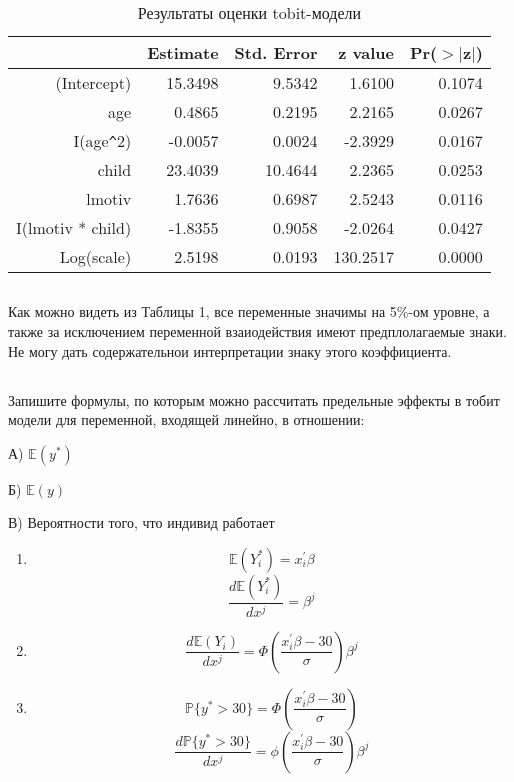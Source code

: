 \documentclass[a4paper,12pt]{article}
\def \mbb{\mathbb}
\def \P{\mbb{P}}
\def \E{\mbb{E}}
\def \b{\beta}
\begin{document}
\begin{table}[ht]
	\centering
	\begin{tabular}{|rrrrr|}
		\hline
		& Estimate & Std. Error & z value & Pr($>$$|$z$|$) \\ 
		\hline
		(Intercept) & 15.3498 & 9.5342 & 1.6100 & 0.1074 \\ 
		age & 0.4865 & 0.2195 & 2.2165 & 0.0267 \\ 
		I(age\verb|^|2) & -0.0057 & 0.0024 & -2.3929 & 0.0167 \\ 
		child & 23.4039 & 10.4644 & 2.2365 & 0.0253 \\ 
		lmotiv & 1.7636 & 0.6987 & 2.5243 & 0.0116 \\ 
		I(lmotiv * child) & -1.8355 & 0.9058 & -2.0264 & 0.0427 \\ 
		Log(scale) & 2.5198 & 0.0193 & 130.2517 & 0.0000 \\ 
		\hline
	\end{tabular}
\caption{Результаты оценки tobit-модели}
\end{table}


\subsection{}

Как можно видеть из Таблицы 1, все переменные значимы на 5\%-ом уровне, а также за исключением переменной взаиодействия имеют предплолагаемые знаки. Не могу дать содержательнои интерпретации знаку этого коэффициента. 

\subsection{}

\Sun Запишите формулы, по которым можно рассчитать предельные эффекты в
тобит модели для переменной, входящей линейно, в отношении:

А) $ \E(y^*) $

Б) $ \E(y) $

В) Вероятности того, что индивид работает

\begin{enumerate}
	\item \[ \E(Y_i^*) = x_i^\prime \b \]
	\[ \frac{d \E(Y_i^*)}{d x^j} = \b^j \]
	
	\item 	\[ \frac{d \E(Y_i)}{d x^j} = \Phi\left(\dfrac{x_i^\prime \b - 30 }{\sigma}\right)\b^j \]
	
	\item \[ \P\{y^* >  30\} =\Phi\left(\dfrac{x_i^\prime \b - 30 }{\sigma}\right) \]
	\[  \frac{d \P\{y^* >  30\}}{d x^j}  = \phi\left(\dfrac{x_i^\prime \b - 30 }{\sigma}\right)\b^j \]
\end{enumerate}
\end{document}
